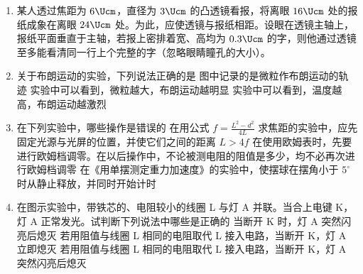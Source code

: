 \documentclass[\gkver]{gaokaozhenti}
\begin{document}
\begin{enumerate}


\item
某人透过焦距为 $6\Ucm$，直径为 $3\Ucm$ 的凸透镜看报，将离眼 $16\Ucm$ 处的报纸成象在离眼 $24\Ucm$ 处。为此，应使透镜与报纸相距\tkanswer[1.5cm]{$4\Ucm$}。设眼在透镜主轴上，报纸平面垂直于主轴，若报上密排着宽、高均为 $0.3\Ucm$ 的字，则他通过透镜至多能看清同一行上个完整的字（忽略眼睛瞳孔的大小）。



\item
关于布朗运动的实验，下列说法正确的是
\onepicture[w=5.56cm]{}
{图中记录的是微粒作布朗运动的轨迹}
{实验中可以看到，微粒越大，布朗运动越明显}
{实验中可以看到，温度越高，布朗运动越激烈}


\item
在下列实验中，哪些操作是错误的
{在用公式 $f = \frac{L^{2} - d^{2}}{4L}$ 求焦距的实验中，应先固定光源与光屏的位置，并使它们之间的距离 $L > 4f$}
{在使用欧姆表时，先要进行欧姆档调零。在以后操作中，不论被测电阻的阻值是多少，均不必再次进行欧姆档调零}
{在《用单摆测定重力加速度》的实验中，使摆球在摆角小于 $5^{\circ}$ 时从静止释放，并同时开始计时}


\item
在图示实验中，带铁芯的、电阻较小的线圈 L 与灯 A 并联。当合上电键 K，灯 A 正常发光。试判断下列说法中哪些是正确的
\onepicture[w=3.65cm]{}
{当断开 K 时，灯 A 突然闪亮后熄灭}
{若用阻值与线圈 L 相同的电阻取代 L 接入电路，当断开 K，灯 A 立即熄灭}
{若用阻值与线圈 L 相同的电阻取代 L 接入电路，当断开 K，灯 A 突然闪亮后熄灭}


\end{enumerate}
\end{document}
